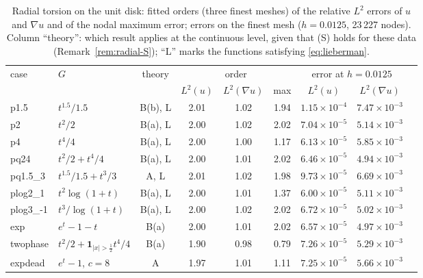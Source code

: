 \documentclass[11pt]{amsart}
\theoremstyle{definition}
\theoremstyle{remark}
\numberwithin{equation}{section}
\newcommand{\abs}[1]{\lvert #1\rvert}
\begin{document}
\begin{table}[t]
\caption{Radial torsion on the unit disk: fitted orders (three finest meshes) of the relative $L^2$ errors of $u$ and $\nabla u$ and of the nodal maximum error; errors on the finest mesh ($h=0.0125$, 23\,227 nodes). Column ``theory'': which result applies at the continuous level, given that (S) holds for these data (Remark~\ref{rem:radial-S}); ``L'' marks the functions satisfying \eqref{eq:lieberman}.}\label{tab:orders}
\small
\begin{tabular}{@{}llccccccc@{}}
\toprule
case & $G$ & theory & \multicolumn{3}{c}{order} & \multicolumn{2}{c}{error at $h=0.0125$}\\
\cmidrule(lr){4-6}\cmidrule(lr){7-8}
& & & $L^2(u)$ & $L^2(\nabla u)$ & max & $L^2(u)$ & $L^2(\nabla u)$\\
\midrule
p1.5 & $t^{1.5}/1.5$ & B(b), L & 2.01 & 1.02 & 1.94 & $1.15\times10^{-4}$ & $7.47\times10^{-3}$\\
p2 & $t^2/2$ & B(a), L & 2.00 & 1.02 & 2.02 & $7.04\times10^{-5}$ & $5.14\times10^{-3}$\\
p4 & $t^4/4$ & B(a), L & 2.00 & 1.00 & 1.17 & $6.13\times10^{-5}$ & $5.85\times10^{-3}$\\
pq24 & $t^2/2+t^4/4$ & B(a), L & 2.00 & 1.01 & 2.02 & $6.46\times10^{-5}$ & $4.94\times10^{-3}$\\
pq1.5\_3 & $t^{1.5}/1.5+t^3/3$ & A, L & 2.01 & 1.02 & 1.98 & $9.73\times10^{-5}$ & $6.69\times10^{-3}$\\
plog2\_1 & $t^2\log(1+t)$ & B(a), L & 2.00 & 1.01 & 1.37 & $6.00\times10^{-5}$ & $5.11\times10^{-3}$\\
plog3\_-1 & $t^3/\log(1+t)$ & B(a), L & 2.00 & 1.02 & 2.02 & $6.72\times10^{-5}$ & $5.02\times10^{-3}$\\
exp & $e^t-1-t$ & B(a) & 2.00 & 1.01 & 2.02 & $6.57\times10^{-5}$ & $4.97\times10^{-3}$\\
twophase & $t^2/2+\mathbf 1_{\abs x>\frac12}t^4/4$ & B(a) & 1.90 & 0.98 & 0.79 & $7.26\times10^{-5}$ & $5.29\times10^{-3}$\\
expdead & $e^t-1$, $c=8$ & A & 1.97 & 1.01 & 1.11 & $7.25\times10^{-5}$ & $5.66\times10^{-3}$\\
\bottomrule
\end{tabular}
\end{table}
\end{document}
